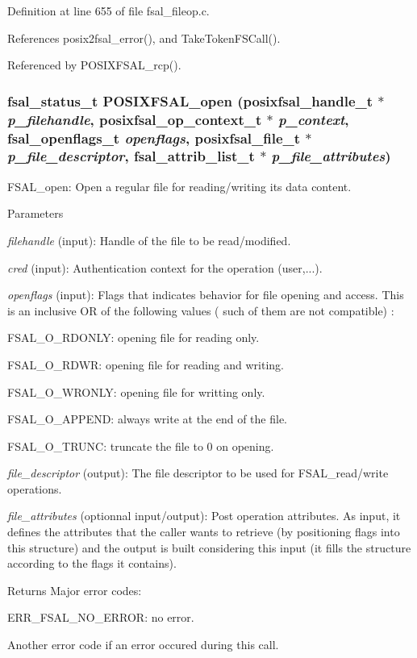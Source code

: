 Definition at line 655 of file fsal\_\-fileop.c.

References posix2fsal\_\-error(), and TakeTokenFSCall().

Referenced by POSIXFSAL\_\-rcp().
\subsubsection[{POSIXFSAL\_\-open}]{\setlength{\rightskip}{0pt plus 5cm}fsal\_\-status\_\-t POSIXFSAL\_\-open (posixfsal\_\-handle\_\-t $\ast$ {\em p\_\-filehandle}, \/  posixfsal\_\-op\_\-context\_\-t $\ast$ {\em p\_\-context}, \/  fsal\_\-openflags\_\-t {\em openflags}, \/  posixfsal\_\-file\_\-t $\ast$ {\em p\_\-file\_\-descriptor}, \/  fsal\_\-attrib\_\-list\_\-t $\ast$ {\em p\_\-file\_\-attributes})}\label{fsal__fileop_8c_a1cdc5a82565a4174a581751c73fcdf70}
FSAL\_\-open: Open a regular file for reading/writing its data content.


\begin{DoxyParams}{Parameters}
\item[{\em filehandle}](input): Handle of the file to be read/modified. \item[{\em cred}](input): Authentication context for the operation (user,...). \item[{\em openflags}](input): Flags that indicates behavior for file opening and access. This is an inclusive OR of the following values ( such of them are not compatible) :
\begin{DoxyItemize}
\item FSAL\_\-O\_\-RDONLY: opening file for reading only.
\item FSAL\_\-O\_\-RDWR: opening file for reading and writing.
\item FSAL\_\-O\_\-WRONLY: opening file for writting only.
\item FSAL\_\-O\_\-APPEND: always write at the end of the file.
\item FSAL\_\-O\_\-TRUNC: truncate the file to 0 on opening. 
\end{DoxyItemize}\item[{\em file\_\-descriptor}](output): The file descriptor to be used for FSAL\_\-read/write operations. \item[{\em file\_\-attributes}](optionnal input/output): Post operation attributes. As input, it defines the attributes that the caller wants to retrieve (by positioning flags into this structure) and the output is built considering this input (it fills the structure according to the flags it contains).\end{DoxyParams}
\begin{DoxyReturn}{Returns}
Major error codes:
\begin{DoxyItemize}
\item ERR\_\-FSAL\_\-NO\_\-ERROR: no error.
\item Another error code if an error occured during this call. 
\end{DoxyItemize}
\end{DoxyReturn}


